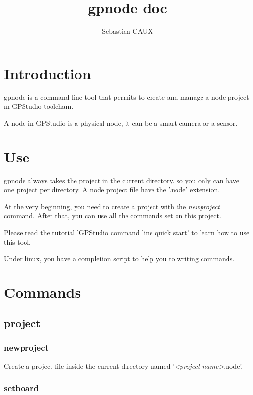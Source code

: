 \documentclass[10pt,a4paper]{article}
\author{Sebastien CAUX}
\title{gpnode doc \version}
\begin{document}
\maketitle
\section{Introduction}
gpnode is a command line tool that permits to create and manage a node project in GPStudio toolchain.

A node in GPStudio is a physical node, it can be a smart camera or a sensor.

\section{Use}
gpnode always takes the project in the current directory, so you only can have one project per directory. A node project file have the '.node' extension.

At the very beginning, you need to create a project with the \emph{newproject} command. After that, you can use all the commands set on this project.

Please read the tutorial 'GPStudio command line quick start' to learn how to use this tool.

Under linux, you have a completion script to help you to writing commands.

\section{Commands}
\subsection{project}
\subsubsection{newproject}

Create a project file inside the current directory named '\emph{<project-name>}.node'.


\subsubsection{setboard}
\end{document}
